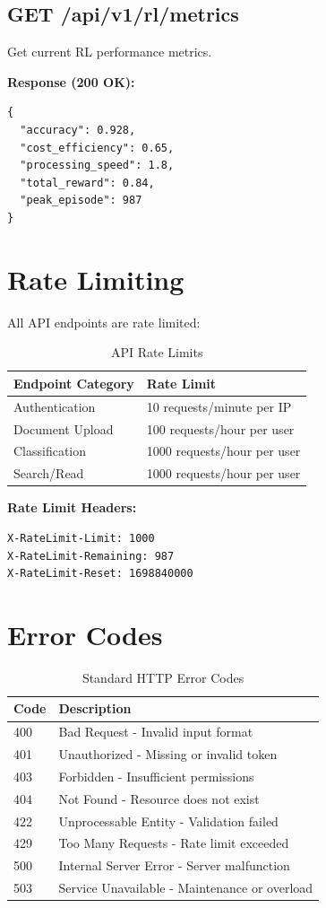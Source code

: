 \subsection{GET /api/v1/rl/metrics}

Get current RL performance metrics.

\textbf{Response (200 OK):}
\begin{lstlisting}[style=pythonstyle]
{
  "accuracy": 0.928,
  "cost_efficiency": 0.65,
  "processing_speed": 1.8,
  "total_reward": 0.84,
  "peak_episode": 987
}
\end{lstlisting}

\section{Rate Limiting}

All API endpoints are rate limited:

\begin{table}[h]
\centering
\caption{API Rate Limits}
\begin{tabularx}{\textwidth}{lX}
\toprule
\textbf{Endpoint Category} & \textbf{Rate Limit} \\
\midrule
Authentication & 10 requests/minute per IP \\
Document Upload & 100 requests/hour per user \\
Classification & 1000 requests/hour per user \\
Search/Read & 1000 requests/hour per user \\
\bottomrule
\end{tabularx}
\end{table}

\textbf{Rate Limit Headers:}
\begin{lstlisting}[style=bashstyle]
X-RateLimit-Limit: 1000
X-RateLimit-Remaining: 987
X-RateLimit-Reset: 1698840000
\end{lstlisting}

\section{Error Codes}

\begin{table}[h]
\centering
\caption{Standard HTTP Error Codes}
\begin{tabularx}{\textwidth}{lX}
\toprule
\textbf{Code} & \textbf{Description} \\
\midrule
400 & Bad Request - Invalid input format \\
401 & Unauthorized - Missing or invalid token \\
403 & Forbidden - Insufficient permissions \\
404 & Not Found - Resource does not exist \\
422 & Unprocessable Entity - Validation failed \\
429 & Too Many Requests - Rate limit exceeded \\
500 & Internal Server Error - Server malfunction \\
503 & Service Unavailable - Maintenance or overload \\
\bottomrule
\end{tabularx}
\end{table}

